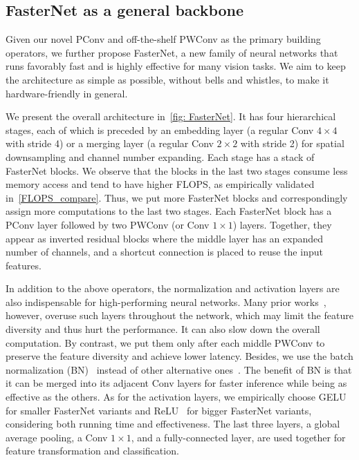\subsection{FasterNet as a general backbone}
Given our novel PConv and off-the-shelf PWConv as the primary building operators, we further propose FasterNet, a new family of neural networks that runs favorably fast and is highly effective for many vision tasks. We aim to keep the architecture as simple as possible, without bells and whistles, to make it hardware-friendly in general. 

We present the overall architecture in~\cref{fig: FasterNet}. It has four hierarchical stages, each of which is preceded by an embedding layer (a regular Conv $4 \times 4$ with stride 4) or a merging layer (a regular Conv $2 \times 2$ with stride 2) for spatial downsampling and channel number expanding. 
Each stage has a stack of FasterNet blocks. We observe that the blocks in the last two stages consume less memory access and tend to have higher FLOPS, as empirically validated in~\cref{FLOPS_compare}. Thus, we put more FasterNet blocks and correspondingly assign more computations to the last two stages. Each FasterNet block has a PConv layer followed by two PWConv (or Conv $1 \times 1$) layers. Together, they appear as inverted residual blocks where the middle layer has an expanded number of channels, and a shortcut connection is placed to reuse the input features. 

In addition to the above operators, the normalization and activation layers are also indispensable for high-performing neural networks.
Many prior works~\cite{he2016deep,sandler2018mobilenetv2,han2020ghostnet}, however, overuse such layers throughout the network, which may limit the feature diversity and thus hurt the performance. It can also slow down the overall computation. By contrast, we put them only after each middle PWConv to preserve the feature diversity and achieve lower latency.
Besides, we use the batch normalization (BN)~\cite{ioffe2015batch} instead of other alternative ones~\cite{ba2016layer,ulyanov2016instance,wu2018group}. The benefit of BN is that it can be merged into its adjacent Conv layers for faster inference while being as effective as the others. As for the activation layers, we empirically choose GELU~\cite{hendrycks2016gaussian} for smaller FasterNet variants and ReLU~\cite{nair2010rectified} for bigger FasterNet variants, considering both running time and effectiveness. The last three layers, \ie a global average pooling, a Conv $1 \times 1$, and a fully-connected layer, are used together for feature transformation and classification.

